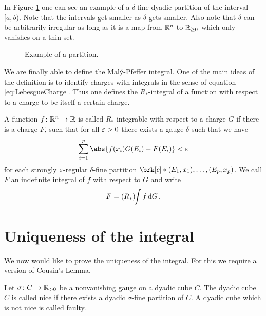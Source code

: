 In Figure \ref{fi:Partition} one can see an example of a $\delta$-fine dyadic partition of the interval $[a,b)$. Note that the intervals get smaller as $\delta$ gets smaller. Also note that $\delta$ can be arbitrarily irregular as long as it is a map from $\mathbb{R}^n$ to $\mathbb{R}_{\geq0}$ which only vanishes on a thin set.


\begin{figure}
\centering

\caption{Example of a partition.}
\label{fi:Partition}
\end{figure}

We are finally able to define the Malý-Pfeffer integral. One of the main ideas of the definition is to identify charges with integrals in the sense of equation \ref{eq:LebesgueCharge}.
Thus one defines the $R_*$-integral of a function with respect to a charge to be itself a certain charge.

\begin{definition}[$R_*$-integral]
A function $f\colon \mathbb{R}^n\to\mathbb{R}$ is called $R_*$-integrable with respect to a charge $G$ if there is a charge $F$, such that for all $\varepsilon>0$ there exists a gauge $\delta$ such that we have
\begin{align*}
	\sum_{i=1}^p\abs{f(x_i)G(E_i)-F(E_i)}<\e
\end{align*}
for each strongly $\varepsilon$-regular $\delta$-fine partition $\brk[c]*{(E_1,x_1),\dots,(E_p,x_p)}$. We call $F$ an indefinite integral of $f$ with respect to $G$ and write
\begin{align*}
	F=(R_*)\!\!\int f\,\mathrm{d} G\,.
\end{align*}
\end{definition}


\section*{Uniqueness of the integral}

We now would like to prove the uniqueness of the integral. For this we require a version of Cousin's Lemma.

\begin{definition}
Let $\sigma\colon C\to\mathbb{R}_{>0}$ be a nonvanishing gauge on a dyadic cube $C$. The dyadic cube $C$ is called nice if there exists a dyadic $\sigma$-fine partition of $C$.
A dyadic cube which is not nice is called faulty.
\end{definition}

